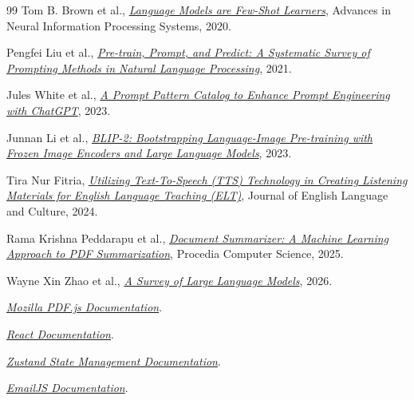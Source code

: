\documentclass[12pt, a4paper]{report}
\begin{document}
\begin{thebibliography}{99}
  Tom B. Brown et al.,
  \textit{\href{https://drive.google.com/file/d/1EGd5i3sy6TM8brJq7mkBhFSSGp0yohHn/view?usp=drive_link}{Language Models are Few-Shot Learners}}, Advances in Neural Information Processing Systems, 2020.

  Pengfei Liu et al.,
  \textit{\href{https://drive.google.com/file/d/1cvVlqafXFmNP3vR7t-Lz69b0kN_i94yd/view?usp=drive_link}{Pre-train, Prompt, and Predict: A Systematic Survey of Prompting Methods in Natural Language Processing}}, 2021.

  Jules White et al.,
  \textit{\href{https://drive.google.com/file/d/18x33udOFvfZraTsLYCr_nLLTw8t8hS5l/view?usp=drive_link}{A Prompt Pattern Catalog to Enhance Prompt Engineering with ChatGPT}}, 2023.

  Junnan Li et al.,
  \textit{\href{https://drive.google.com/file/d/1gMl7C14kMdREkaQ9C2LOHM_-myDFGoGN/view?usp=drive_link}{BLIP-2: Bootstrapping Language-Image Pre-training with Frozen Image Encoders and Large Language Models}}, 2023.

  Tira Nur Fitria,
  \textit{\href{https://drive.google.com/file/d/1Q49At_7yHsdbXEcGZLa-xRuIxvWlIeqW/view?usp=drive_link}{Utilizing Text-To-Speech (TTS) Technology in Creating Listening Materials for English Language Teaching (ELT)}}, Journal of English Language and Culture, 2024.

  Rama Krishna Peddarapu et al.,
  \textit{\href{https://drive.google.com/file/d/1lcGT274bMno2-Ec5LqcDxJGVaemmb6Zt/view?usp=drive_link}{Document Summarizer: A Machine Learning Approach to PDF Summarization}}, Procedia Computer Science, 2025.

  Wayne Xin Zhao et al.,
  \textit{\href{https://drive.google.com/file/d/18yCd-hhyIrcaVDVAliXe6xxyjBC3sOMJ/view?usp=drive_link}{A Survey of Large Language Models}}, 2026.

  \textit{\href{https://mozilla.github.io/pdf.js/}{Mozilla PDF.js Documentation}}.

  \textit{\href{https://react.dev/}{React Documentation}}.

  \textit{\href{https://github.com/pmndrs/zustand}{Zustand State Management Documentation}}.

  \textit{\href{https://www.emailjs.com/docs/}{EmailJS Documentation}}.

\end{thebibliography}
\end{document}
